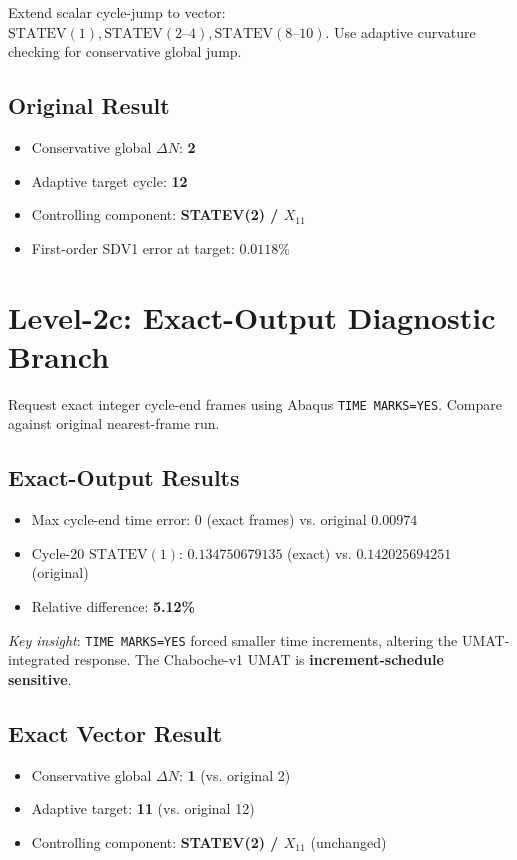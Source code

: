 \documentclass[11pt]{article}
\begin{document}
Extend scalar cycle-jump to vector: $\text{STATEV}(1), \text{STATEV}(2\text{--}4), \text{STATEV}(8\text{--}10)$. Use adaptive curvature checking for conservative global jump.

\subsection{Original Result}
\begin{itemize}
  \item Conservative global $\Delta N$: \textbf{2}
  \item Adaptive target cycle: \textbf{12}
  \item Controlling component: \textbf{STATEV(2) / $X_{11}$}
  \item First-order SDV1 error at target: $0.0118\%$
\end{itemize}

\section{Level-2c: Exact-Output Diagnostic Branch}

Request exact integer cycle-end frames using Abaqus \texttt{TIME MARKS=YES}. Compare against original nearest-frame run.

\subsection{Exact-Output Results}
\begin{itemize}
  \item Max cycle-end time error: $0$ (exact frames) vs. original $0.00974$
  \item Cycle-20 $\text{STATEV}(1)$: $0.134750679135$ (exact) vs. $0.142025694251$ (original)
  \item Relative difference: \textbf{5.12\%}
\end{itemize}

\textit{Key insight}: \texttt{TIME MARKS=YES} forced smaller time increments, altering the UMAT-integrated response. The Chaboche-v1 UMAT is \textbf{increment-schedule sensitive}.

\subsection{Exact Vector Result}
\begin{itemize}
  \item Conservative global $\Delta N$: \textbf{1} (vs. original 2)
  \item Adaptive target: \textbf{11} (vs. original 12)
  \item Controlling component: \textbf{STATEV(2) / $X_{11}$} (unchanged)
\end{itemize}
\end{document}
